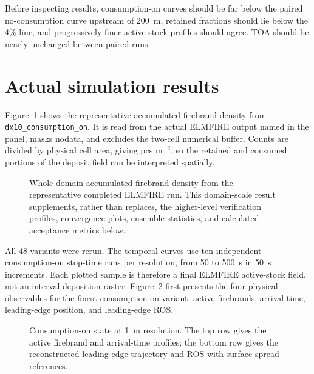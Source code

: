 Before inspecting results, consumption-on curves should be far below the paired
no-consumption curve upstream of 200~m, retained fractions should lie below the
4\% line, and progressively finer active-stock profiles should agree. TOA
should be nearly unchanged between paired runs.

\section{Actual simulation results}

Figure~\ref{fig:domain-result} shows the representative accumulated firebrand density from \texttt{dx10\_consumption\_on}.
It is read from the actual ELMFIRE output named in the panel, masks nodata, and excludes
the two-cell numerical buffer.  Counts are divided by physical cell area, giving pcs m$^{-2}$, so the retained and consumed portions of the deposit field can be interpreted spatially.

\begin{figure}[H]
\centering
{}
\caption{Whole-domain accumulated firebrand density from the representative completed ELMFIRE run.  This
domain-scale result supplements, rather than replaces, the higher-level verification
profiles, convergence plots, ensemble statistics, and calculated acceptance metrics below.}
\label{fig:domain-result}
\end{figure}


All 48 variants were rerun. The temporal curves use ten independent
consumption-on stop-time runs per resolution, from 50 to 500~s in 50~s
increments. Each plotted sample is therefore a final ELMFIRE active-stock
field, not an interval-deposition raster. Figure~\ref{fig:consumption-state}
first presents the four physical observables for the finest consumption-on
variant: active firebrands, arrival time, leading-edge position, and
leading-edge ROS.

\begin{figure}[H]
\centering
{}
\caption{Consumption-on state at 1~m resolution. The top row gives the active
firebrand and arrival-time profiles; the bottom row gives the reconstructed
leading-edge trajectory and ROS with surface-spread references.}
\label{fig:consumption-state}
\end{figure}

